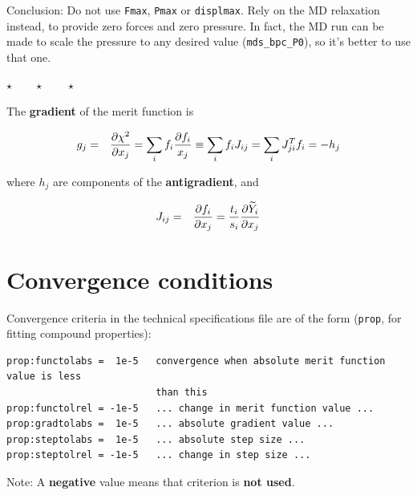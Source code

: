 \documentclass[a4paper,12pt,pdftex,onecolumn]{article}
\newcommand{\stars}{\begin{center}%
\vspace{1em plus 0.5em minus 0.5em}%
$\star \qquad \star \qquad \star$%
\vspace{1em plus 0.5em minus 0.5em}%
\end{center}}
\begin{document}
Conclusion: Do not use \verb+Fmax+, \verb+Pmax+ or \verb+displmax+. Rely on the
MD relaxation instead, to provide zero forces and zero pressure.
In fact, the MD run can be made to scale the pressure to any desired
value (\verb+mds_bpc_P0+), so it's better to use that one.


\stars



The \textbf{gradient} of the merit function is

\begin{eqnarray}
g_j &=& {\partial \chi^2 \over \partial x_j}
= \sum_i f_i {\partial f_i \over x_j}
\equiv \sum_i f_i J_{ij} = \sum_i J^T_{ji} f_i = -h_j
\end{eqnarray}

where $h_j$ are components of the \textbf{antigradient}, and

\begin{eqnarray}
J_{ij} &=& {\partial f_i \over \partial x_j}
= {t_i \over s_i} {\partial \widetilde{Y}_i \over \partial x_j}
\end{eqnarray}





\section{Convergence conditions}


Convergence criteria in the technical specifications file are of the form
(\verb+prop+, for fitting compound properties):

\begin{Verbatim}[fontsize=\relsize{-1},frame=single]
prop:functolabs =  1e-5   convergence when absolute merit function value is less
                          than this
prop:functolrel = -1e-5   ... change in merit function value ...
prop:gradtolabs =  1e-5   ... absolute gradient value ...
prop:steptolabs =  1e-5   ... absolute step size ...
prop:steptolrel = -1e-5   ... change in step size ...
\end{Verbatim}

Note: A \textbf{negative} value means that criterion is \textbf{not used}.
\end{document}
